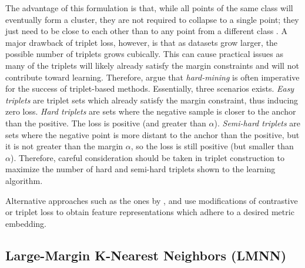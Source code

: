 	The advantage of this formulation is that, while all points of the same class will eventually form a cluster, they are not required to collapse to a single point; they just need to be close to each other than to any point from a different class \citep{Hermans2017DefenseTripletLoss}.  A major drawback of triplet loss, however, is that as datasets grow larger, the possible number of triplets grows cubically.  This can cause practical issues as many of the triplets will likely already satisfy the margin constraints and will not contribute toward learning.  Therefore, \cite{Schroff2015FaceNet} argue that \textit{hard-mining} is often imperative for the success of triplet-based methods.   Essentially, three scenarios exists.  \textit{Easy triplets} are triplet sets which already satisfy the margin constraint, thus inducing zero loss.  \textit{Hard triplets} are sets where the negative sample is closer to the anchor than the positive.  The loss is positive (and greater than $\alpha$).  \textit{Semi-hard triplets} are sets where the negative point is more distant to the anchor than the positive, but it is not greater than the margin $\alpha$, so the loss is still positive (but smaller than $\alpha$).  Therefore, careful consideration should be taken in triplet construction to maximize the number of hard and semi-hard triplets shown to the learning algorithm. 
	
	Alternative approaches such as the ones by \cite{Sohn2016NPairLoss}, \cite{Deng2019ArcFaceAngularMarginLoss} and \cite{Xu2014LargeMarginWeaklySupervisedDR} use modifications of contrastive or triplet loss to obtain feature representations which adhere to a desired metric embedding.

		\subsection{Large-Margin K-Nearest Neighbors (LMNN)}
		
